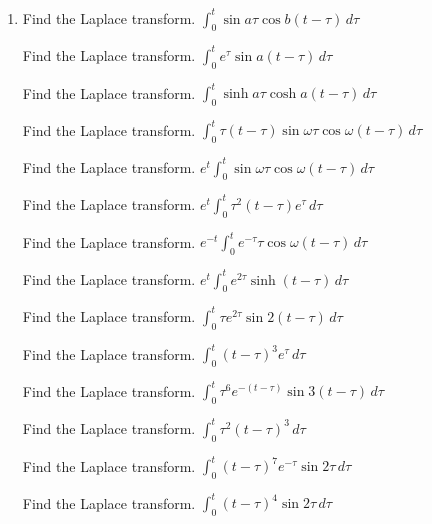 \documentclass{ximera}
\begin{document}
\begin{problem}\label{exer:8.6.2}

\begin{enumerate}

\item Find the Laplace transform.
$\int_0^t\sin a\tau\cos b(t-\tau)\, d\tau$

Find the Laplace transform.
$\int_0^t e^\tau\sin a(t-\tau)\,d\tau$ 

Find the Laplace transform. $\int_0^t\sinh a\tau\cosh a(t-\tau)\,d\tau$

Find the Laplace transform.
$\int_0^t\tau(t-\tau)\sin \omega\tau\cos\omega
(t-\tau)\,d\tau$

Find the Laplace transform.
$e^t\int_0^t\sin\omega\tau
\cos\omega (t-\tau)\,d\tau$

Find the Laplace transform.
$e^t\int_0^t\tau^2 (t-\tau)e^\tau\,d\tau$

Find the Laplace transform.
$e^{-t}\int_0^t e^{-\tau}\tau\cos\omega (t-\tau)\,d\tau$

Find the Laplace transform.
$e^t\int_0^t e^{2\tau}\sinh
(t-\tau)\,d\tau$

Find the Laplace transform.
$\int_0^t\tau e^{2\tau}\sin
2(t-\tau)\,d\tau$

Find the Laplace transform.
$\int_0^t (t-\tau)^3 e^\tau\, d\tau$

Find the Laplace transform.
$\int_0^t\tau^6
e^{-(t-\tau)}\sin 3(t-\tau)\,d\tau$

Find the Laplace transform.
$\int_0^t\tau^2 (t-\tau)^3\,
d\tau$

Find the Laplace transform.
$\int_0^t (t-\tau)^7 e^{-\tau}
\sin 2\tau\,d\tau$

Find the Laplace transform.
$\int_0^t (t-\tau)^4\sin
2\tau\,d\tau$
\end{enumerate}
\end{problem}
\end{document}
